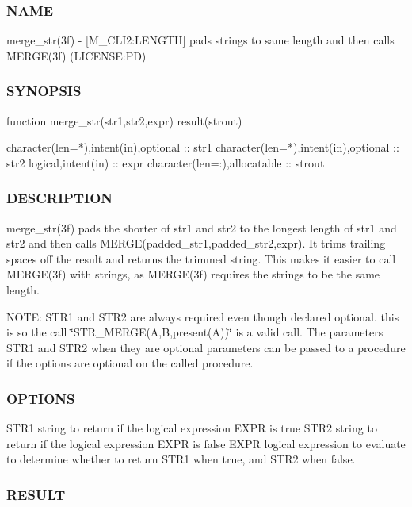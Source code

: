 \subsubsection*{N\+A\+ME}

merge\+\_\+str(3f) -\/ \mbox{[}M\+\_\+\+C\+L\+I2\+:L\+E\+N\+G\+TH\mbox{]} pads strings to same length and then calls M\+E\+R\+G\+E(3f) (L\+I\+C\+E\+N\+SE\+:PD) 

\subsubsection*{S\+Y\+N\+O\+P\+S\+IS}

\begin{DoxyVerb}function merge_str(str1,str2,expr) result(strout)

 character(len=*),intent(in),optional :: str1
 character(len=*),intent(in),optional :: str2
 logical,intent(in)              :: expr
 character(len=:),allocatable    :: strout
\end{DoxyVerb}
 \subsubsection*{D\+E\+S\+C\+R\+I\+P\+T\+I\+ON}

merge\+\_\+str(3f) pads the shorter of str1 and str2 to the longest length of str1 and str2 and then calls M\+E\+R\+G\+E(padded\+\_\+str1,padded\+\_\+str2,expr). It trims trailing spaces off the result and returns the trimmed string. This makes it easier to call M\+E\+R\+G\+E(3f) with strings, as M\+E\+R\+G\+E(3f) requires the strings to be the same length.

N\+O\+TE\+: S\+T\+R1 and S\+T\+R2 are always required even though declared optional. this is so the call \char`\"{}\+S\+T\+R\+\_\+\+M\+E\+R\+G\+E(\+A,\+B,present(\+A))\char`\"{} is a valid call. The parameters S\+T\+R1 and S\+T\+R2 when they are optional parameters can be passed to a procedure if the options are optional on the called procedure.

\subsubsection*{O\+P\+T\+I\+O\+NS}

S\+T\+R1 string to return if the logical expression E\+X\+PR is true S\+T\+R2 string to return if the logical expression E\+X\+PR is false E\+X\+PR logical expression to evaluate to determine whether to return S\+T\+R1 when true, and S\+T\+R2 when false. \subsubsection*{R\+E\+S\+U\+LT}


